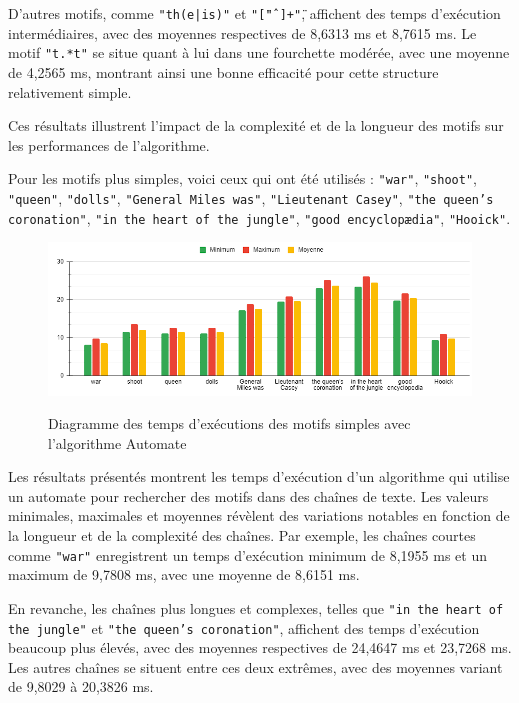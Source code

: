 \documentclass{article}
\begin{document}
D'autres motifs, comme \texttt{"th(e|is)"} et \texttt{"\"[\^ " ]+\""}, affichent des temps d'exécution intermédiaires, avec des moyennes respectives de 8,6313 ms et 8,7615 ms. Le motif \texttt{"t.*t"} se situe quant à lui dans une fourchette modérée, avec une moyenne de 4,2565 ms, montrant ainsi une bonne efficacité pour cette structure relativement simple.

Ces résultats illustrent l'impact de la complexité et de la longueur des motifs sur les performances de l'algorithme.

Pour les motifs plus simples, voici ceux qui ont été utilisés : \texttt{"war"}, \texttt{"shoot"}, \texttt{"queen"}, \texttt{"dolls"}, \texttt{"General Miles was"}, \texttt{"Lieutenant Casey"}, \texttt{"the queen's coronation"}, \texttt{"in the heart of the jungle"}, \texttt{"good encyclopædia"}, \texttt{"Hooick"}.

\newpage

\begin{figure}[ht] %
    \centering
    \includegraphics[width=1\textwidth]{./ressources/test_automate_motifs.png}
    \caption{Diagramme des temps d'exécutions des motifs simples avec l'algorithme Automate}
    \cite{test_automate_motif}
    \label{fig:test_automate_motif}
\end{figure}


Les résultats présentés montrent les temps d'exécution d'un algorithme qui utilise un automate pour rechercher des motifs dans des chaînes de texte. Les valeurs minimales, maximales et moyennes révèlent des variations notables en fonction de la longueur et de la complexité des chaînes. Par exemple, les chaînes courtes comme \texttt{"war"} enregistrent un temps d'exécution minimum de 8,1955 ms et un maximum de 9,7808 ms, avec une moyenne de 8,6151 ms.

En revanche, les chaînes plus longues et complexes, telles que \texttt{"in the heart of the jungle"} et \texttt{"the queen’s coronation"}, affichent des temps d'exécution beaucoup plus élevés, avec des moyennes respectives de 24,4647 ms et 23,7268 ms. Les autres chaînes se situent entre ces deux extrêmes, avec des moyennes variant de 9,8029 à 20,3826 ms.
\end{document}

